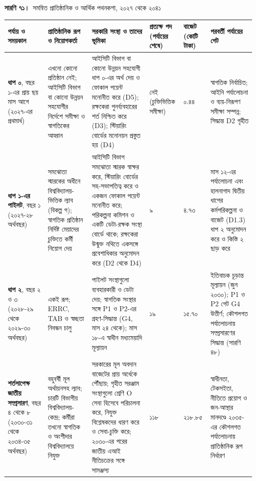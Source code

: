 \documentclass[border=10pt]{standalone}
\begin{document}
\begin{minipage}{22cm}
{\large\bfseries সারণি ৭১।}\ {\large সমন্বিত প্রাতিষ্ঠানিক ও আর্থিক পথনকশা, ২০২৭ থেকে ২০৪১}\par\vspace{7pt}
\small
{}
\begin{tabularx}{\linewidth}{@{}>{\hsize=1.274\hsize\raggedright\arraybackslash}X>{\hsize=1.221\hsize\raggedright\arraybackslash}X>{\hsize=1.381\hsize\raggedright\arraybackslash}X>{\hsize=0.478\hsize\raggedright\arraybackslash}X>{\hsize=0.531\hsize\raggedright\arraybackslash}X>{\hsize=1.115\hsize\raggedright\arraybackslash}X@{}}
\arrayrulecolor{bapilrule}\toprule
\rowcolor{white}\textbf{পর্যায় ও সময়কাল} & \textbf{প্রাতিষ্ঠানিক রূপ ও নিয়োগকর্তা} & \textbf{সরকারি সংস্থা ও তাদের ভূমিকা} & \textbf{প্রত্যক্ষ পদ (পর্যায়ের শেষে)} & \textbf{বাজেট (কোটি টাকা)} & \textbf{পরবর্তী পর্যায়ের গেট} \\
\midrule
\textbf{ধাপ ০}, বছর ১-এর প্রায় ছয় মাস আগে (২০২৭-এর প্রথমার্ধ) & এখনো কোনো প্রতিষ্ঠান নেই; আইসিটি বিভাগ বা কোনো উন্নয়ন সহযোগীর নির্দেশে সমীক্ষা ও স্বাগতিকের আহ্বান & আইসিটি বিভাগ বা কোনো উন্নয়ন সহযোগী ধাপ ০-এর অর্থ দেয় ও ফোকাল পয়েন্ট মনোনীত করে (D5); রক্ষকেরা পুনর্ব্যবহারের শর্ত নিশ্চিত করে (D3); স্টিয়ারিং বোর্ডের মনোনয়ন প্রস্তুত হয় (D4) & নেই (চুক্তিভিত্তিক সমীক্ষা) & ০.৪৪ & স্বাগতিক নির্বাচিত; আইনি পর্যালোচনা ও ব্যয়-নিরূপণ সমীক্ষা সম্পন্ন; সিদ্ধান্ত D2 গৃহীত \\
\textbf{ধাপ ১-এর পাইলট}, বছর ১ (২০২৭-২৮ অর্থবছর) & সমঝোতা স্মারকের অধীনে বিশ্ববিদ্যালয়-ভিত্তিক ল্যাব (বিকল্প গ); স্বাগতিক প্রতিষ্ঠান নির্দিষ্ট মেয়াদের চুক্তিতে কর্মী নিয়োগ দেয় & আইসিটি বিভাগ সমঝোতা স্মারক স্বাক্ষর করে, স্টিয়ারিং বোর্ডের সহ-সভাপতিত্ব করে ও একজন ফোকাল পয়েন্ট মনোনীত করে; পরিকল্পনা কমিশন ও একটি ডেটা-রক্ষক সংস্থা বোর্ডে থাকে; রক্ষকেরা উন্মুক্ত নথিতে একসঙ্গে প্রবেশাধিকার অনুমোদন করে (D2 থেকে D4) & ৯ & ৪.৭৩ & মাস ১২-এর পর্যালোচনা এবং হালনাগাদ দ্বিতীয় ধাপের কর্মপরিকল্পনা ও বাজেট (D1.3) ধাপ ২ অনুমোদন করে ও কিস্তি ২ ছাড় করে \\
\textbf{ধাপ ২}, বছর ২ ও ৩ (২০২৮-২৯ থেকে ২০২৯-৩০ অর্থবছর) & একই রূপ; ERRC, TAB ও স্বচ্ছতা নিবন্ধন চালু & পাইলট সংস্থাগুলো ব্যবহারকারী ও ডেটা দেয়; স্বাগতিক সংস্থার সঙ্গে P1 ও P2-এর গ্রহণ-সিদ্ধান্ত (G4, মাস ২৪ থেকে); মাস ১৮-এ স্বাধীন মধ্যমেয়াদি মূল্যায়ন & ১৯ & ১৫.৭০ & ইতিবাচক চূড়ান্ত মূল্যায়ন (জুন ২০৩০); P1 ও P2 গেট G4 উত্তীর্ণ; কৌশলগত পর্যালোচনায় সম্প্রসারণের সিদ্ধান্ত (সারণি ৪৮) \\
\textbf{শর্তসাপেক্ষ জাতীয় সম্প্রসারণ}, বছর ৪ থেকে ৮ (২০৩০-৩১ থেকে ২০৩৪-৩৫ অর্থবছর) & বহুবর্ষী মূল অর্থায়নসহ ল্যাব; চারটি বিভাগীয় বিশ্ববিদ্যালয়-কেন্দ্র; কর্মীরা তখনো স্বাগতিক ও অংশীদার বিশ্ববিদ্যালয়ে নিযুক্ত & সরকারের মূল অবদান বাজেটের প্রায় অর্ধেকে পৌঁছায়; গৃহীত সরঞ্জাম সংস্থাগুলো শ্রেণি O সেবা হিসেবে পরিচালনা করে, নিযুক্ত বিশ্লেষকদের ধারণ করে ও সেবা-চুক্তি করে; ২০৩০-এর পরের জাতীয় এআই নীতিচক্রের সঙ্গে সামঞ্জস্য & ১১৮ & ২১৮.৮৫ & স্বাধীনতা, টেকসইতা, নীতিতে প্রয়োগ ও জন-আস্থার মানদণ্ডে ২০৩৫-এর কৌশলগত পর্যালোচনায় প্রাতিষ্ঠানিক রূপ নির্ধারণ \\

\end{tabularx}
\end{minipage}
\end{document}
